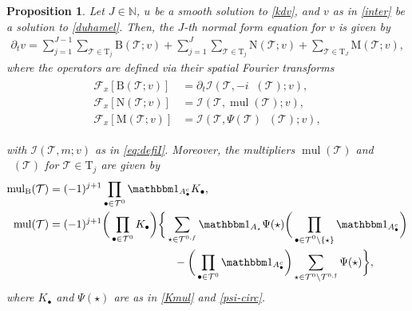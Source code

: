 \documentclass[%
11pt,  reqno]{amsart}
\newcommand{\5}{\textup{V}}
\newcommand{\noi}{\noindent}
\newcommand{\ind}{\mathbbm 1}
\newcommand{\dt}{\partial_t}
\newtheorem{proposition}[theorem]{Proposition}
\theoremstyle{remark}
\newcommand{\bul}{\bullet}
\newcommand{\TT}{\mathcal{T}}
\newcommand{\Tr}{\mathrm{T}}
\newcommand{\Ft}{{\mathcal{F}}}
\newcommand{\ff}{\mathfrak{f}}
\newcommand{\N}{\mathbb{N}}
\DeclareMathOperator{\mul}{mul}
\DeclareMathOperator{\mulB}{mul_{\BB}}
\newcommand{\Ical}{\mathcal{I}}
\numberwithin{equation}{section}
\numberwithin{theorem}{section}
\newcommand{\MM}{\mathrm{M}}
\newcommand{\NN}{\mathrm{N}}
\newcommand{\BB}{\mathrm{B}}
\begin{document}
\begin{proposition}
\label{PRO:NFE}
Let $J\in\N$, $u$ be a smooth solution to \eqref{kdv}, and $v$ as in \eqref{inter} be a solution to \eqref{duhamel}.
Then, 
the $J$-th normal form equation for $v$ is given by
\begin{align}
\label{NFE1}
\dt v=
\sum_{j=1}^{J-1} \sum_{\TT\in \Tr_j} \BB(\TT; v) 
+ \sum_{j=1}^{J} \sum_{\TT\in \Tr_j} \NN(\TT; v) 
+ \sum_{\TT\in \Tr_{J}}
\MM(\TT; v),
\end{align}
where the operators are defined via their spatial Fourier transforms
\begin{align}
\label{NFE1a}
\begin{split}
\Ft_x [\BB(\TT;v)]  & = \dt\Ical(\TT, - i \mulB(\TT); v),\\
\Ft_x [\NN(\TT;v)]  & = \Ical(\TT, \mul(\TT) ; v  ), \\
\Ft_x [\MM(\TT;v)] & = \Ical(\TT, \Psi(\TT)\mulB(\TT); v),
\end{split}
\end{align}

\noi
with $\Ical(\TT, m; v)$ as in \eqref{eq:defiI}.
Moreover,
the multipliers $\mul(\TT)$ and $\mulB(\TT)$ for $\TT\in \Tr_j$ are given by
\begin{align}
\label{NFE0b}
\begin{split}
\mulB(\TT)
& =  (-1)^{j+1}  \prod_{\bul \in \TT^0}  \ind_{A^c_{\bul}} K_\bul
,
\\
\mul(\TT) & =  (-1)^{j+1} \bigg(\prod_{\bul \in \TT^0} K_\bul \bigg) \bigg\{  \sum_{\star \in \TT^{0,f}}
\ind_{A_{\star}} \Psi(\star) \bigg(\prod_{\substack{\bul \in \TT^0 \setminus\{\star\} %
}} \ind_{A^c_{\bul}} \bigg)\\
&
\hspace{4cm}
-
\bigg( \prod_{\bul \in \TT^0} \ind_{A_\bul^c} \bigg)
\sum_{\star\in \TT^0 \setminus \TT^{0,\ff}} \Psi(\star)
 \bigg\},
\end{split}
\end{align}
where $K_\bul$ and $\Psi(\star)$ are as in \eqref{Kmul} and \eqref{psi-circ}. 

\end{proposition}
\end{document}

